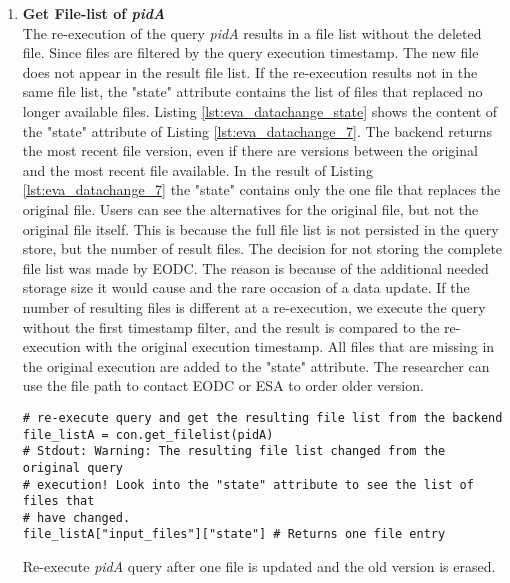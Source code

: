 \documentclass[draft,final]{vutinfth} %
\newenvironment{code}{\captionsetup{type=listing}}{}
\begin{document}
\begin{enumerate}
	\item \textbf{Get File-list of \textit{pidA}}\\ 
	The re-execution of the query \textit{pidA} results in a file list without the deleted file. Since files are filtered by the query execution timestamp. The new file does not appear in the result file list. If the re-execution results not in the same file list, the "state" attribute contains the list of files that replaced no longer available files. Listing \ref{lst:eva_datachange_state} shows the content of the "state" attribute of Listing \ref{lst:eva_datachange_7}. The backend returns the most recent file version, even if there are versions between the original and the most recent file available. In the result of Listing \ref{lst:eva_datachange_7} the "state" contains only the one file that replaces the original file. Users can see the alternatives for the original file, but not the original file itself. This is because the full file list is not persisted in the query store, but the number of result files. The decision for not storing the complete file list was made by EODC. The reason is because of the additional needed storage size it would cause and the rare occasion of a data update. If the number of resulting files is different at a re-execution, we execute the query without the first timestamp filter, and the result is compared to the re-execution with the original execution timestamp. All files that are missing in the original execution are added to the "state" attribute. The researcher can use the file path to contact EODC or ESA to order older version.   
	\begin{code}
		\begin{verbatim}
# re-execute query and get the resulting file list from the backend
file_listA = con.get_filelist(pidA)
# Stdout: Warning: The resulting file list changed from the original query
# execution! Look into the "state" attribute to see the list of files that
# have changed. 
file_listA["input_files"]["state"] # Returns one file entry
		\end{verbatim}
		\caption{Re-execute \textit{pidA} query after one file is updated and the old version is erased.}
		\label{lst:eva_datachange_7}
	\end{code}	
	
	

\end{enumerate}
\end{document}
